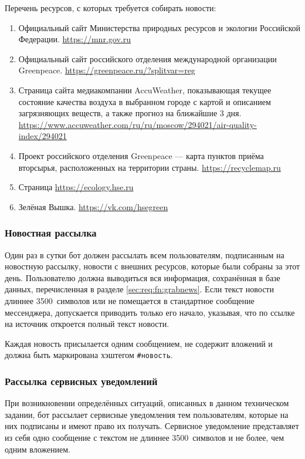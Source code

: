     Перечень ресурсов, с которых требуется собирать новости:
    \begin{enumerate}
        \item
            Официальный сайт Министерства природных ресурсов и экологии Российской Федерации.
            \url{https://mnr.gov.ru}
        \item
            Официальный сайт российского отделения международной организации Greenpeace.
            \url{https://greenpeace.ru/?splitvar=reg}
        \item
            Страница сайта медиакомпании AccuWeather, показывающая текущее состояние качества воздуха
            в выбранном городе с картой и описанием загрязняющих веществ, а также прогноз на ближайшие
            3 дня.
            \url{https://www.accuweather.com/ru/ru/moscow/294021/air-quality-index/294021}
        \item
            Проект российского отделения Greenpeace --- карта пунктов приёма вторсырья,
            расположенных на территории страны.
            \url{https://recyclemap.ru}
        \item
            Страница \url{https://ecology.hse.ru}
        \item
            Зелёная Вышка. \url{https://vk.com/hsegreen}
    \end{enumerate}

\subsubsection{Новостная рассылка}
    \label{sec:req:fn:news}
    Один раз в сутки бот
    должен рассылать всем пользователям, подписанным на новостную рассылку, новости с внешних
    ресурсов, которые были собраны за этот день. Пользователю
    должна выводиться вся информация, сохранённая в базе данных, перечисленная в разделе
    \ref{sec:req:fn:grabnews}. Если текст новости длиннее 3500~символов или не помещается в
    стандартное сообщение мессенджера, допускается приводить только его начало, указывая,
    что по ссылке на источник откроется полный текст новости.

    Каждая новость присылается одним сообщением, не содержит вложений и
    должна быть маркирована хэштегом \hbox{\texttt{\#новость}}.

\subsubsection{Рассылка сервисных уведомлений}
    \label{sec:req:fn:service}
    При возникновении определённых ситуаций, описанных в данном техническом задании,
    бот рассылает сервисные уведомления тем пользователям, которые на них подписаны и имеют
    право их получать. Сервисное уведомление представляет из себя одно сообщение с текстом
    не длиннее 3500~символов и не более, чем одним вложением.

